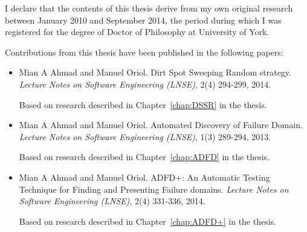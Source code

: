 \begin{declaration}

I declare that the contents of this thesis derive from my own original research between January 2010 and September 2014, the period during which I was registered for the degree of Doctor of Philosophy at University of York.

Contributions from this thesis have been published in the following papers: \\

\begin{itemize}

\item Mian A Ahmad and Manuel Oriol. Dirt Spot Sweeping Random strategy. \textit{Lecture Notes on Software Engineering (LNSE)}, 2(4) 294-299, 2014.

Based on research described in Chapter~\ref{chap:DSSR} in the thesis.\\

\item Mian A Ahmad and Manuel Oriol. Automated Discovery of Failure Domain. \textit{Lecture Notes on Software Engineering (LNSE)}, 1(3) 289-294, 2013.

Based on research described in Chapter~\ref{chap:ADFD} in the thesis.\\

\item Mian A Ahmad and Manuel Oriol. ADFD+: An Automatic Testing Technique for Finding and Presenting Failure domains. \textit{Lecture Notes on Software Engineering (LNSE)}, 2(4) 331-336, 2014.

Based on research described in Chapter~\ref{chap:ADFD+} in the thesis.\\


\end{itemize}

\end{declaration}